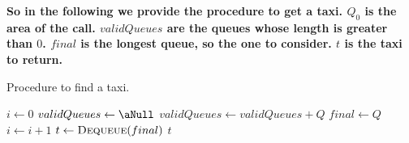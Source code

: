 {\textbf{So in the following we provide the procedure to get a taxi. $Q_0$ is the area of the call. $validQueues$ are the queues whose length is greater than $0$. $final$ is the longest queue, so the one to consider. $t$ is the taxi to return.}} %

\begin{algorithm}
\caption{Procedure to find a taxi.} \label{alg:getTaxi}
\begin{algorithmic}[1]
	\State $i \gets 0$
	\Repeat
		\State $validQueues \gets \aNull$
				\State $validQueues \gets validQueues + Q$
			\EndIf
		\EndFor
				\State $final \gets Q$
			\EndIf
		\EndFor
		\State $i \gets i + 1$
	\State $t \gets \Call{Dequeue}{final}$
	\State \Return $t$ 
\EndProcedure
\end{algorithmic}
\end{algorithm}










